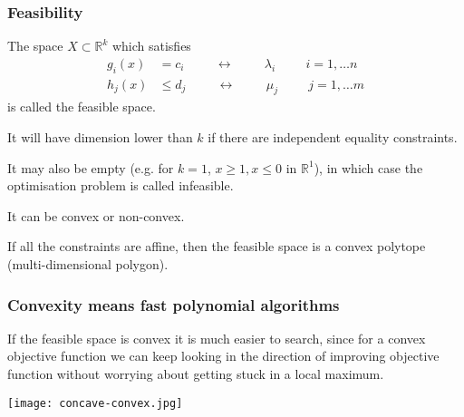 \documentclass[10pt,aspectratio=169,dvipsnames]{beamer}
\newcommand{\R}{\mathbb{R}}
\def\l{\lambda}
\def\m{\mu}
\begin{document}
\begin{frame}
  \frametitle{Feasibility}

  The space $X \subset \R^k$ which satisfies
\begin{align*}
  g_i(x) & = c_i \hspace{1cm}\leftrightarrow\hspace{1cm} \l_i \hspace{1cm} i = 1,\dots n \\
  h_j(x) & \leq d_j \hspace{1cm}\leftrightarrow\hspace{1cm} \m_j \hspace{1cm} j = 1,\dots m
\end{align*}
is called the \alert{feasible space}.

It will have dimension lower than $k$ if there are independent
equality constraints.

It may also be empty (e.g. for $k=1$, $x \geq 1, x \leq 0$ in $\R^1$), in which
case the optimisation problem is called \alert{infeasible}.

It can be \alert{convex} or \alert{non-convex}.

If all the constraints are affine, then the feasible space is a convex polytope (multi-dimensional polygon).


\end{frame}


\begin{frame}
  \frametitle{Convexity means fast polynomial algorithms}

  If the feasible space is \alert{convex} it is much easier to search, since for a convex objective function we can keep looking in the direction of improving objective function without worrying about getting stuck in a local maximum.

  \centering
  \texttt{[image: concave-convex.jpg]}

\end{frame}
\end{document}
